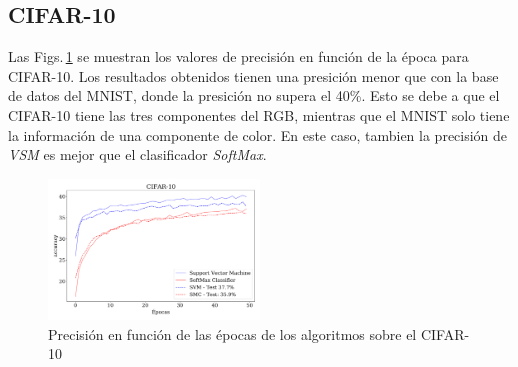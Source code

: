 

\subsection*{CIFAR-10}

Las Figs.\,\ref{fig:ejer5_cifar10_acc}  se muestran los valores de precisión en función de la época para CIFAR-10.  Los resultados obtenidos tienen una presición menor que con la base de datos del MNIST, donde la presición no supera el 40\%. Esto se debe a que el CIFAR-10 tiene las tres componentes del RGB, mientras que el MNIST solo tiene la información de una componente de color. En este caso, tambien la precisión de \emph{VSM} es mejor que el clasificador \emph{SoftMax}.%

\begin{figure}[H]
    \centering
    \includegraphics[width=0.5\textwidth]{plots/ejer_5_CIFAR-10_acc.pdf}
    \caption{Precisión en función de las épocas de los algoritmos sobre el CIFAR-10}
    \label{fig:ejer5_cifar10_acc}
\end{figure} 



